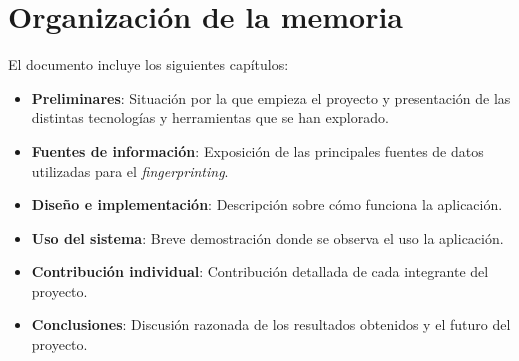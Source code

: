 \section{Organización de la memoria}
El documento incluye los siguientes capítulos:
\begin{itemize}
    \item \textbf{Preliminares}: Situación por la que empieza el proyecto y presentación de las distintas tecnologías y herramientas que se han explorado.
    \item \textbf{Fuentes de información}: Exposición de las principales fuentes de datos utilizadas para el \textit{fingerprinting}.
    \item \textbf{Diseño e implementación}: Descripción sobre cómo funciona la aplicación.
    \item \textbf{Uso del sistema}: Breve demostración donde se observa el uso la aplicación.
    \item \textbf{Contribución individual}: Contribución detallada de cada integrante del proyecto.
    \item \textbf{Conclusiones}: Discusión razonada de los resultados obtenidos y el futuro del proyecto.
\end{itemize}